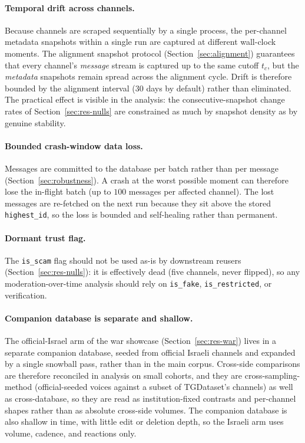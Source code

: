 \paragraph{Temporal drift across channels.}
Because channels are scraped sequentially by a single process, the per-channel metadata snapshots within a single run are captured at different wall-clock moments. The alignment snapshot protocol (Section~\ref{sec:alignment}) guarantees that every channel's \emph{message} stream is captured up to the same cutoff $t_c$, but the \emph{metadata} snapshots remain spread across the alignment cycle. Drift is therefore bounded by the alignment interval ($30$ days by default) rather than eliminated. The practical effect is visible in the analysis: the consecutive-snapshot change rates of Section~\ref{sec:res-nulls} are constrained as much by snapshot density as by genuine stability.

\paragraph{Bounded crash-window data loss.}
Messages are committed to the database per batch rather than per message (Section~\ref{sec:robustness}). A crash at the worst possible moment can therefore lose the in-flight batch (up to $100$ messages per affected channel). The lost messages are re-fetched on the next run because they sit above the stored \texttt{highest\_id}, so the loss is bounded and self-healing rather than permanent.

\paragraph{Dormant trust flag.}
The \texttt{is\_scam} flag should not be used as-is by downstream reusers (Section~\ref{sec:res-nulls}): it is effectively dead (five channels, never flipped), so any moderation-over-time analysis should rely on \texttt{is\_fake}, \texttt{is\_restricted}, or verification.

\paragraph{Companion database is separate and shallow.}
The official-Israel arm of the war showcase (Section~\ref{sec:res-war}) lives in a separate companion database, seeded from official Israeli channels and expanded by a single snowball pass, rather than in the main corpus. Cross-side comparisons are therefore reconciled in analysis on small cohorts, and they are cross-sampling-method (official-seeded voices against a subset of TGDataset's channels) as well as cross-database, so they are read as institution-fixed contrasts and per-channel shapes rather than as absolute cross-side volumes. The companion database is also shallow in time, with little edit or deletion depth, so the Israeli arm uses volume, cadence, and reactions only.

